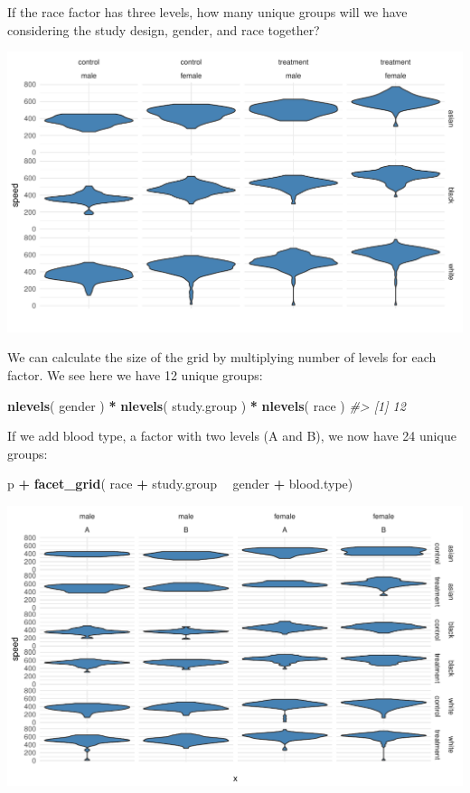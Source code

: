 \documentclass[]{book}
\newenvironment{Shaded}{\begin{snugshade}}{\end{snugshade}}
\newcommand{\CommentTok}[1]{\textcolor[rgb]{0.56,0.35,0.01}{\textit{#1}}}
\newcommand{\KeywordTok}[1]{\textcolor[rgb]{0.13,0.29,0.53}{\textbf{#1}}}
\newcommand{\NormalTok}[1]{#1}
\newcommand{\OperatorTok}[1]{\textcolor[rgb]{0.81,0.36,0.00}{\textbf{#1}}}
\newcommand{\StringTok}[1]{\textcolor[rgb]{0.31,0.60,0.02}{#1}}
\theoremstyle{definition}
\theoremstyle{definition}
\theoremstyle{definition}
\theoremstyle{remark}
\begin{document}
If the race factor has three levels, how many unique groups will we have
considering the study design, gender, and race together?

\begin{center}\includegraphics[width=0.7\linewidth]{DS4PS-I_files/figure-latex/unnamed-chunk-113-1} \end{center}

We can calculate the size of the grid by multiplying number of levels
for each factor. We see here we have 12 unique groups:

\begin{Shaded}
\begin{Highlighting}[]

\KeywordTok{nlevels}\NormalTok{( gender ) }\OperatorTok{*}\StringTok{ }\KeywordTok{nlevels}\NormalTok{( study.group ) }\OperatorTok{*}\StringTok{ }\KeywordTok{nlevels}\NormalTok{( race )}
\CommentTok{#> [1] 12}
\end{Highlighting}
\end{Shaded}

If we add blood type, a factor with two levels (A and B), we now have 24
unique groups:

\begin{Shaded}
\begin{Highlighting}[]

\NormalTok{p }\OperatorTok{+}\StringTok{ }\KeywordTok{facet_grid}\NormalTok{( race }\OperatorTok{+}\StringTok{ }\NormalTok{study.group }\OperatorTok{~}\StringTok{ }\NormalTok{gender }\OperatorTok{+}\StringTok{ }\NormalTok{blood.type) }
\end{Highlighting}
\end{Shaded}

\begin{center}\includegraphics[width=0.7\linewidth]{DS4PS-I_files/figure-latex/unnamed-chunk-115-1} \end{center}
\end{document}
